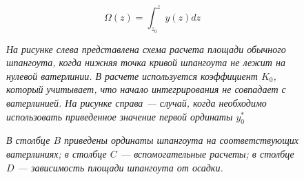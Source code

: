 \begin{equation}
    \Omega (z) = \int_{z_0}^z y(z) dz
\end{equation}

\begin{figure}[h!]
    \centerline{}
    \caption{К расчету интеграла с переменным верхним пределом}
    \caption*{\textit{На рисунке слева представлена схема расчета площади обычного шпангоута, когда нижняя точка кривой шпангоута не лежит на нулевой ватерлинии.
    В расчете используется коэффициент $K_0$, который учитывает, что начало интегрирования не совпадает с ватерлинией.
    На рисунке справа --- случай, когда необходимо использовать приведенное значение первой ординаты $y_0^*$}}
    \label{fig:station-area}
\end{figure}

\begin{figure}
    \footnotesize
    \centering
    \caption{Схема расчета зависимости площади шпангоута от осадки в табличном редакторе}
    \caption*{\textit{В столбце $B$ приведены ординаты шпангоута на соответствующих ватерлиниях;
    в столбце $C$ --- вспомогательные расчеты;
    в столбце $D$ --- зависимость площади шпангоута от осадки.}}
    \label{fig:station-area-calculation}
\end{figure}

